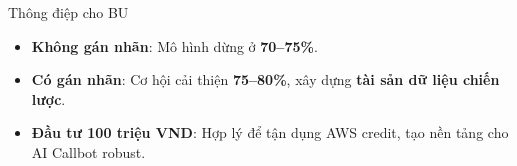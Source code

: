 \documentclass{beamer}
\begin{document}
\begin{frame}{Thông điệp cho BU}
    \begin{itemize}
        \item \textbf{Không gán nhãn}: Mô hình dừng ở \textbf{70--75\%}.
        \item \textbf{Có gán nhãn}: Cơ hội cải thiện \textbf{75--80\%}, xây dựng \textbf{tài sản dữ liệu chiến lược}.
        \item \textbf{Đầu tư 100 triệu VND}: Hợp lý để tận dụng AWS credit, tạo nền tảng cho AI Callbot robust.
    \end{itemize}
\end{frame}

\end{document}
